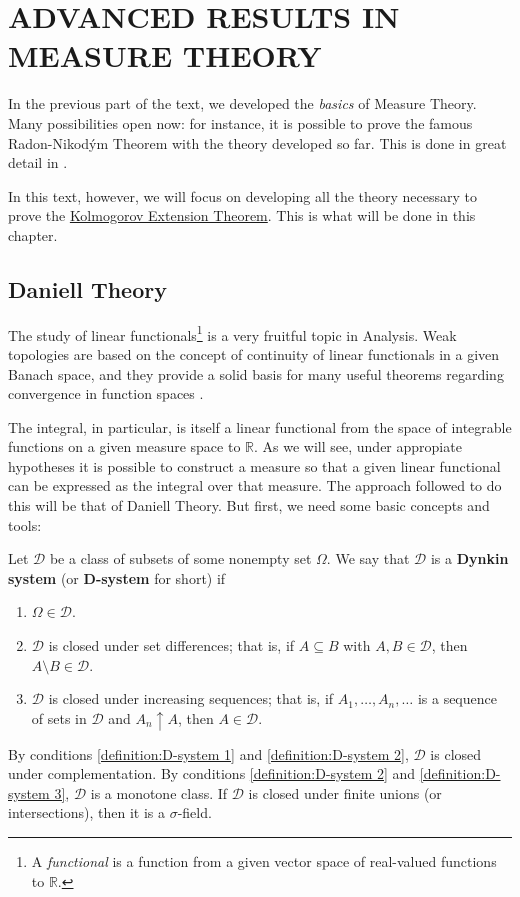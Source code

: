 
\chapter{ADVANCED RESULTS IN MEASURE THEORY}\label{chapter:advanced results in measure theory}

In the previous part of the text, we developed the \emph{basics} of Measure Theory. Many possibilities open now: for instance, it is possible to prove the famous Radon-Nikodým Theorem with the theory developed so far. This is done in great detail in .

In this text, however, we will focus on developing all the theory necessary to prove the \hyperref[theorem:Kolmogorov Extension]{Kolmogorov Extension Theorem}. This is what will be done in this chapter.
\section{Daniell Theory}\label{section:Daniell Theory}
The study of linear functionals\footnote{A \emph{functional} is a function from a given vector space of real-valued functions to \(\mathbb{R}\).} is a very fruitful topic in Analysis. Weak topologies are based on the concept of continuity of linear functionals in a given Banach space, and they provide a solid basis for many useful theorems regarding convergence in function spaces \cite{brezis}.

The integral, in particular, is itself a linear functional from the space of integrable functions on a given measure space to \(\mathbb{R}\). As we will see, under appropiate hypotheses it is possible to construct a measure so that a given linear functional can be expressed as the integral over that measure. The approach followed to do this will be that of Daniell Theory. But first, we need some basic concepts and tools:

\begin{defn}
Let \(\mathcal{D}\) be a class of subsets of some nonempty set \(\Omega\). We say that \(\mathcal{D}\) is a \textbf{Dynkin system} (or \textbf{D-system} for short) if
\begin{enumerate}
		\item \label{definition:D-system 1}\(\Omega\in\mathcal{D}\).
		\item \label{definition:D-system 2}\(\mathcal{D}\) is closed under set differences; that is, if \(A\subseteq B\) with \(A,B\in\mathcal{D}\), then \(A\setminus B\in\mathcal{D}\).
		\item \label{definition:D-system 3}\(\mathcal{D}\) is closed under increasing sequences; that is, if \(A_1,\dots,A_n,\dots\) is a sequence of sets in \(\mathcal{D}\) and \(A_n\uparrow A\), then \(A\in\mathcal{D}\).
\end{enumerate}
\end{defn}
By conditions \ref{definition:D-system 1} and \ref{definition:D-system 2}, \(\mathcal{D}\) is closed under complementation. By conditions \ref{definition:D-system 2} and \ref{definition:D-system 3},  \(\mathcal{D}\) is a monotone class. If \(\mathcal{D}\) is closed under finite unions (or intersections), then it is a \(\sigma\)-field.


